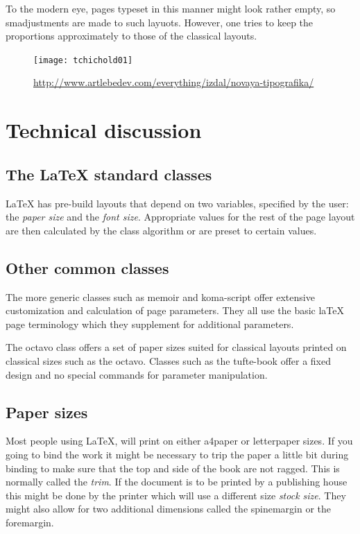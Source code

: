 To the modern eye, pages typeset in this manner might look rather empty, so smadjustments are made to such layuots. However, one tries to keep the proportions approximately to those of the classical layouts.
 
\begin{figure}[htbp]
  \texttt{[image: tchichold01]}
  \caption{\protect\url{http://www.artlebedev.com/everything/izdal/novaya-tipografika/}}
\end{figure}

\section{Technical discussion}
\subsection{The LaTeX standard classes}

LaTeX has pre-build layouts that depend  on two variables, specified by the user: the \textit{paper size} and the \textit{font size}. Appropriate values for the rest of the page layout are then  calculated by the class algorithm or are preset to certain values.

\subsection{Other common classes}

The more generic classes such as memoir and koma-script offer extensive customization and calculation of page parameters. They all use the basic laTeX page terminology which they supplement for additional parameters.

The octavo class offers a set of paper sizes suited for classical layouts printed on classical sizes such as the octavo. Classes such as the tufte-book offer a fixed design and no special commands for parameter manipulation.

\subsection{Paper sizes}

Most people using LaTeX, will print on either a4paper or letterpaper sizes. If you going to bind the work it might be necessary to trip the paper a little bit during binding to make sure that the top and side of the book are not ragged. This is normally called the \textit{trim}. If the document is to be printed by a publishing house this might be done by the printer which will use a different size \textit{stock size}. They might also allow for two additional dimensions called the spinemargin or the foremargin.

